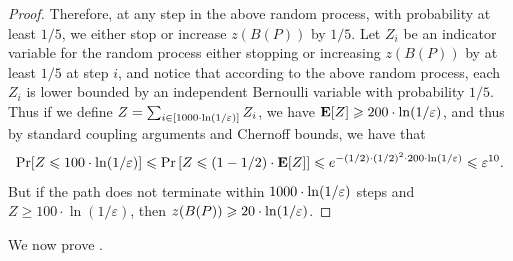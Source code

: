 \begin{proof}
  Therefore, at any step in the above random process, with probability at least $1/5$, we either stop or increase $z(B(P))$ by $1/5$.  
  Let $Z_i$ be an indicator variable for the random process either stopping or increasing $z(B(P))$ by at least $1/5$ at step $i$, and notice that according 
  to the above random process, each $Z_i$ is lower bounded by an independent Bernoulli variable with probability $1/5$.
  Thus if we define $Z = \sum_{i \in [1000 \cdot \ln (1/\varepsilon)]} Z_i$, we have ${\bf E}[Z] \geqslant 200 \cdot \ln (1/\varepsilon)$, and thus by 
  standard coupling arguments and Chernoff bounds, we have that
    $$\Pr[Z \leqslant 100 \cdot \ln (1/\varepsilon)] \leqslant \Pr \left[Z \leqslant (1 - 1/2) \cdot {\bf E}[Z] \right] \leqslant e^{-(1/2) \cdot (1/2)^2 \cdot 200 \cdot \ln (1/\varepsilon)} \leqslant \varepsilon^{10}.$$ 
 But if the path does not terminate within $1000 \cdot \ln (1/\varepsilon)$ steps and $Z \geq 100 \cdot \ln(1/\varepsilon)$, 
 then $z(B(P)) \geqslant 20 \cdot \ln(1/\varepsilon)$. 
\end{proof}

We now prove .




